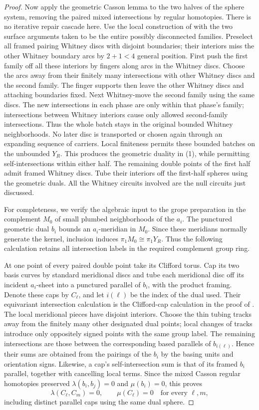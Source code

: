 \begin{proof}
Now apply the geometric Casson lemma to the two halves of the sphere
system, removing the paired mixed intersections by regular homotopies.
There is no iterative repair cascade here.  Use the local construction
of \cite[Lemma~3.3]{PRT} with the two surface arguments taken to be the
entire possibly disconnected families.  Preselect all framed pairing
Whitney discs with disjoint boundaries; their interiors miss the other
Whitney boundary arcs by $2+1<4$ general position.  First push the first
family off all these interiors by fingers along arcs in the Whitney
discs.  Choose the arcs away from their finitely many intersections
with other Whitney discs and the second family.  The finger supports
then leave the other Whitney discs and attaching boundaries fixed.
Next Whitney-move the second family using the same discs.  The new
intersections in each phase are only within that phase's family;
intersections between Whitney interiors cause only allowed
second-family intersections.  Thus the whole batch stays in the
original bounded Whitney neighborhoods.  No later disc is transported
or chosen again through an expanding sequence of carriers.  Local
finiteness permits these bounded batches on the unbounded $Y_R$.
This produces the geometric duality in (1), while permitting
self-intersections within either half.  The remaining double points
of the first half admit framed Whitney discs.  Tube their interiors
off the first-half spheres using the geometric duals.  All the
Whitney circuits involved are the null circuits just discussed.

For completeness, we verify the algebraic input to the grope preparation
in the complement $M_0$ of small plumbed neighborhoods of the $a_i$.
The punctured geometric dual $b_i$ bounds an $a_i$-meridian in $M_0$.
Since these meridians normally generate the kernel, inclusion induces
$\pi_1M_0\cong\pi_1Y_R$.  Thus the following calculation retains all
intersection labels in the required complement group ring.

At one point of every paired double point take its Clifford torus.
Cap its two basis curves by standard meridional discs and tube each
meridional disc off its incident $a_i$-sheet into a punctured parallel
of $b_i$, with the product framing.  Denote these caps by $C_\ell$,
and let $i(\ell)$ be the index of the dual used.  Their equivariant
intersection calculation is the Clifford-cap calculation in the proof
of \cite[Section~5]{PRT}.  The local meridional pieces have disjoint
interiors.  Choose the thin tubing tracks away from the finitely many
other designated dual points; local changes of tracks introduce only
oppositely signed points with the same group label.  The remaining
intersections are those between the corresponding based parallels of
$b_{i(\ell)}$.  Hence their sums are obtained from the pairings of the
$b_i$ by the basing units and orientation signs.  Likewise, a cap's
self-intersection sum is that of its framed $b_i$ parallel, together
with cancelling local terms.  Since the mixed Casson regular homotopies
preserved $\lambda(b_i,b_j)=0$ and $\mu(b_i)=0$, this proves
\[
 \lambda(C_\ell,C_m)=0,\qquad \mu(C_\ell)=0
 \quad\text{for every }\ell,m,
\]
including distinct parallel caps using the same dual sphere.


\end{proof}

